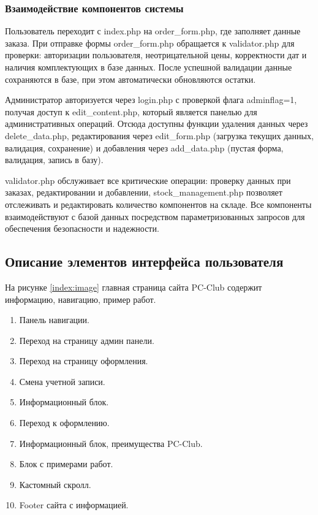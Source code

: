 \subsubsection{Взаимодействие компонентов системы}
Пользователь переходит с index.php на order\_form.php, где заполняет данные заказа. При отправке формы order\_form.php обращается к validator.php для проверки: авторизации пользователя, неотрицательной цены, корректности дат и наличия комплектующих в базе данных. После успешной валидации данные сохраняются в базе, при этом автоматически обновляются остатки.

Администратор авторизуется через login.php с проверкой флага adminflag=1, получая доступ к edit\_content.php, который является панелью для административных операций. Отсюда доступны функции удаления данных через delete\_data.php, редактирования через edit\_form.php (загрузка текущих данных, валидация, сохранение) и добавления через add\_data.php (пустая форма, валидация, запись в базу).

validator.php обслуживает все критические операции: проверку данных при заказах, редактировании и добавлении, stock\_management.php позволяет отслеживать и редактировать количество компонентов на складе. Все компоненты взаимодействуют с базой данных посредством параметризованных запросов для обеспечения безопасности и надежности.


\subsection{Описание элементов интерфейса пользователя}

На рисунке \ref{index:image} главная страница сайта PC-Club содержит информацию, навигацию, пример работ.

\begin{enumerate}
	\item Панель навигации.
	\item Переход на страницу админ панели.
	\item Переход на страницу оформления.
	\item Смена учетной записи.
	\item Информационный блок.
	\item Переход к оформлению.
	\item Информационный блок, преимущества PC-Club.
	\item Блок с примерами работ.
	\item Кастомный скролл.
	\item Footer сайта с информацией.
\end{enumerate}

